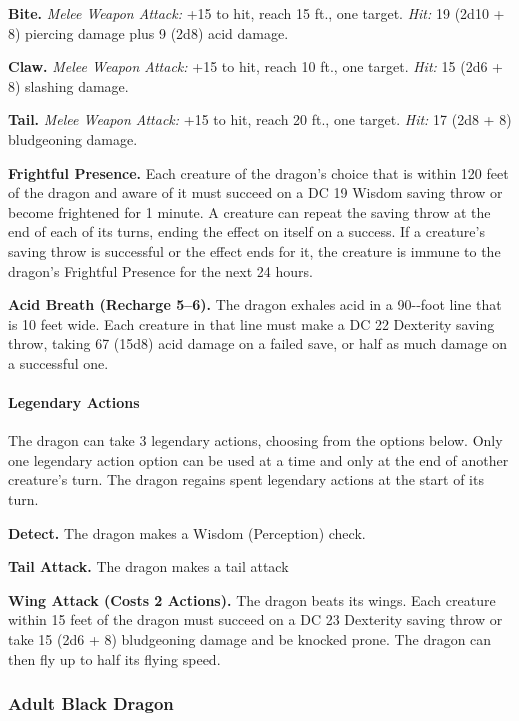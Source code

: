 \documentclass[
]{article}
\begin{document}
\textbf{Bite.} \emph{Melee Weapon Attack:} +15 to hit, reach 15 ft., one
target. \emph{Hit:} 19 (2d10 + 8) piercing damage plus 9 (2d8) acid
damage.

\textbf{Claw.} \emph{Melee Weapon Attack:} +15 to hit, reach 10 ft., one
target. \emph{Hit:} 15 (2d6 + 8) slashing damage.

\textbf{Tail.} \emph{Melee Weapon Attack:} +15 to hit, reach 20 ft., one
target. \emph{Hit:} 17 (2d8 + 8) bludgeoning damage.

\textbf{Frightful Presence.} Each creature of the dragon's choice that
is within 120 feet of the dragon and aware of it must succeed on a DC 19
Wisdom saving throw or become frightened for 1 minute. A creature can
repeat the saving throw at the end of each of its turns, ending the
effect on itself on a success. If a creature's saving throw is
successful or the effect ends for it, the creature is immune to the
dragon's Frightful Presence for the next 24 hours.

\textbf{Acid Breath (Recharge 5--6).} The dragon exhales acid in a
90-­‐foot line that is 10 feet wide. Each creature in that line must
make a DC 22 Dexterity saving throw, taking 67 (15d8) acid damage on a
failed save, or half as much damage on a successful one.

\hypertarget{legendary-actions}{%
\paragraph{Legendary Actions}\label{legendary-actions}}

The dragon can take 3 legendary actions, choosing from the options
below. Only one legendary action option can be used at a time and only
at the end of another creature's turn. The dragon regains spent
legendary actions at the start of its turn.

\textbf{Detect.} The dragon makes a Wisdom (Perception) check.

\textbf{Tail Attack.} The dragon makes a tail attack

\textbf{Wing Attack (Costs 2 Actions).} The dragon beats its wings. Each
creature within 15 feet of the dragon must succeed on a DC 23 Dexterity
saving throw or take 15 (2d6 + 8) bludgeoning damage and be knocked
prone. The dragon can then fly up to half its flying speed.

\hypertarget{adult-black-dragon}{%
\subsubsection{Adult Black Dragon}\label{adult-black-dragon}}
\end{document}
